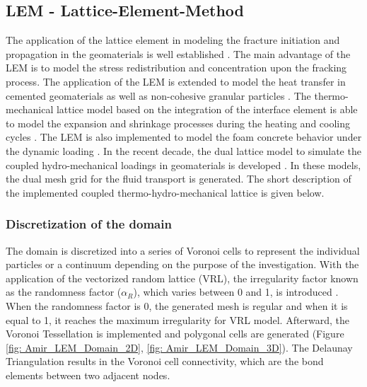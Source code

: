 \subsection{LEM - Lattice-Element-Method}

The application of the lattice element in modeling the fracture initiation and propagation in the geomaterials is well established \cite{Liuetal2007, Pradoetal2003, Vanmieretal2002}. The main advantage of the LEM is to model the stress redistribution and concentration upon the fracking process. The application of the LEM is extended to model the heat transfer in cemented geomaterials \cite{Sattarietal2017} as well as non-cohesive granular particles \cite{Rizvietal2018b}. The thermo-mechanical lattice model based on the integration of the interface element is able to model the expansion and shrinkage processes during the heating and cooling cycles \cite{Sattarietal2019b}. The LEM is also implemented to model the foam concrete behavior under the dynamic loading \cite{Rizvietal2018a}. In the recent decade, the dual lattice model to simulate the coupled hydro-mechanical loadings in geomaterials is developed \cite{Grassl2009}. In these models, the dual mesh grid for the fluid transport is generated. The short description of the implemented coupled thermo-hydro-mechanical lattice is given below.

\subsubsection*{Discretization of the domain}

The domain is discretized into a series of Voronoi cells to represent the individual particles or a continuum depending on the purpose of the investigation. With the application of the vectorized random lattice (VRL), the irregularity factor known as the randomness factor ($\alpha_{R}$), which varies between 0 and 1, is introduced \cite{Moukarzeletal1992}. When the randomness factor is 0, the generated mesh is regular and when it is equal to 1, it reaches the maximum irregularity for VRL model.  Afterward, the Voronoi Tessellation is implemented and polygonal cells are generated (Figure \ref{fig: Amir_LEM_Domain_2D}, \ref{fig: Amir_LEM_Domain_3D}). The Delaunay Triangulation results in the Voronoi cell connectivity, which are the bond elements between two adjacent nodes. 

